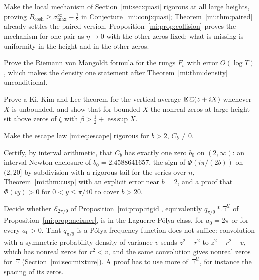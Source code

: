 \begin{problem}\label{mi:prob:quasi}
Make the local mechanism of Section~\ref{mi:sec:quasi} rigorous at all large heights, proving $B_{\cosh}\ge\sigma_{\max}^\infty-\frac12$ in Conjecture~\ref{mi:conj:quasi}; Theorem~\ref{mi:thm:paired} already settles the paired version. Proposition~\ref{mi:prop:collision} proves the mechanism for one pair as $\eta\to0$ with the other zeros fixed; what is missing is uniformity in the height and in the other zeros.
\end{problem}

\begin{problem}\label{mi:prob:rvm}
Prove the Riemann von Mangoldt formula for the rungs $F_b$ with error $O(\log T)$, which makes the density one statement after Theorem~\ref{mi:thm:density} unconditional.
\end{problem}

\begin{problem}
Prove a Ki, Kim and Lee theorem for the vertical average $\mathbb{E}\,\Xi(z+iX)$ whenever $X$ is unbounded, and show that for bounded $X$ the nonreal zeros at large height sit above zeros of $\zeta$ with $\beta>\frac12+\operatorname{ess\,sup}X$.
\end{problem}

\begin{problem}\label{mi:prob:escape}
Make the escape law \eqref{mi:eq:escape} rigorous for $b>2$, $C_b\ne0$.
\end{problem}

\begin{problem}\label{mi:prob:b0}
Certify, by interval arithmetic, that $C_b$ has exactly one zero $b_0$ on $(2,\infty)$: an interval Newton enclosure of $b_0=2.4588641657$, the sign of $\Phi(i\pi/(2b))$ on $(2,20]$ by subdivision with a rigorous tail for the series over $n$, Theorem~\ref{mi:thm:cusp} with an explicit error near $b=2$, and a proof that $\Phi(iy)>0$ for $0<y\le\pi/40$ to cover $b>20$.
\end{problem}

\begin{problem}\label{mi:prob:E}
Decide whether $\mathcal E_{2\pi/9}$ of Proposition~\ref{mi:prop:rigid}, equivalently $q_{\pi/9}*\Xi^{\mathcal U}$ of Proposition~\ref{mi:prop:meixner}, is in the Laguerre P\'olya class, for $a_0=2\pi$ or for every $a_0>0$. That $q_{\pi/9}$ is a P\'olya frequency function does not suffice: convolution with a symmetric probability density of variance $v$ sends $z^2-r^2$ to $z^2-r^2+v$, which has nonreal zeros for $r^2<v$, and the same convolution gives nonreal zeros for $\Xi$ (Section~\ref{mi:sec:mixture}). A proof has to use more of $\Xi^{\mathcal U}$, for instance the spacing of its zeros.
\end{problem}

